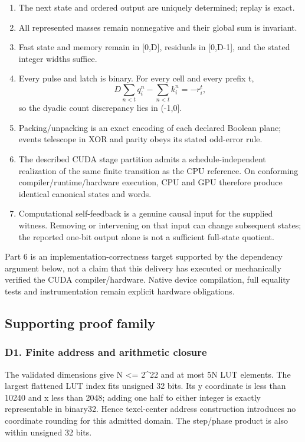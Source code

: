 \documentclass[11pt,a4paper]{article}
\providecommand{\tightlist}{\setlength{\itemsep}{0pt}\setlength{\parskip}{0pt}}
\begin{document}
\begin{enumerate}
\def\labelenumi{\arabic{enumi}.}
\tightlist
\item
  The next state and ordered output are uniquely determined; replay is exact.
\item
  All represented masses remain nonnegative and their global sum is invariant.
\item
  Fast state and memory remain in {[}0,D{]}, residuals in {[}0,D-1{]}, and the stated integer widths suffice.
\item
  Every pulse and latch is binary. For every cell and every prefix t, \[D\sum_{n<t}q_i^n-\sum_{n<t}k_i^n=-r_i^t,\] so the dyadic count discrepancy lies in (-1,0{]}.
\item
  Packing/unpacking is an exact encoding of each declared Boolean plane; events telescope in XOR and parity obeys its stated odd-error rule.
\item
  The described CUDA stage partition admits a schedule-independent realization of the same finite transition as the CPU reference. On conforming compiler/runtime/hardware execution, CPU and GPU therefore produce identical canonical states and words.
\item
  Computational self-feedback is a genuine causal input for the supplied witness. Removing or intervening on that input can change subsequent states; the reported one-bit output alone is not a sufficient full-state quotient.
\end{enumerate}

Part 6 is an implementation-correctness target supported by the dependency argument below, not a claim that this delivery has executed or mechanically verified the CUDA compiler/hardware. Native device compilation, full equality tests and instrumentation remain explicit hardware obligations.

\subsection{Supporting proof family}\label{supporting-proof-family}

\subsubsection{D1. Finite address and arithmetic closure}\label{d1.-finite-address-and-arithmetic-closure}

The validated dimensions give N \textless= 2\^{}22 and at most 5N LUT elements. The largest flattened LUT index fits unsigned 32 bits. Its y coordinate is less than 10240 and x less than 2048; adding one half to either integer is exactly representable in binary32. Hence texel-center address construction introduces no coordinate rounding for this admitted domain. The step/phase product is also within unsigned 32 bits.
\end{document}
